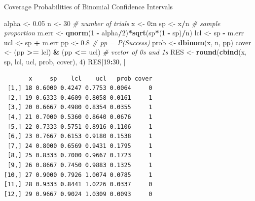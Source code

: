 \documentclass[
  ignorenonframetext,
]{beamer}
\newenvironment{Shaded}{\begin{snugshade}}{\end{snugshade}}
\newcommand{\CommentTok}[1]{\textcolor[rgb]{0.56,0.35,0.01}{\textit{#1}}}
\newcommand{\DecValTok}[1]{\textcolor[rgb]{0.00,0.00,0.81}{#1}}
\newcommand{\FloatTok}[1]{\textcolor[rgb]{0.00,0.00,0.81}{#1}}
\newcommand{\FunctionTok}[1]{\textcolor[rgb]{0.13,0.29,0.53}{\textbf{#1}}}
\newcommand{\NormalTok}[1]{#1}
\newcommand{\OtherTok}[1]{\textcolor[rgb]{0.56,0.35,0.01}{#1}}
\newcommand{\SpecialCharTok}[1]{\textcolor[rgb]{0.81,0.36,0.00}{\textbf{#1}}}
\begin{document}
\begin{frame}[fragile]{Coverage Probabilities of Binomial Confidence
Intervals}
\protect\hypertarget{coverage-probabilities-of-binomial-confidence-intervals-3}{}
\tiny

\begin{Shaded}
\begin{Highlighting}[]
\NormalTok{alpha }\OtherTok{\textless{}{-}} \FloatTok{0.05}
\NormalTok{n }\OtherTok{\textless{}{-}} \DecValTok{30}   \CommentTok{\# number of trials}
\NormalTok{x }\OtherTok{\textless{}{-}} \DecValTok{0}\SpecialCharTok{:}\NormalTok{n  }
\NormalTok{sp }\OtherTok{\textless{}{-}}\NormalTok{ x}\SpecialCharTok{/}\NormalTok{n }\CommentTok{\# sample proportion}
\NormalTok{m.err }\OtherTok{\textless{}{-}} \FunctionTok{qnorm}\NormalTok{(}\DecValTok{1} \SpecialCharTok{{-}}\NormalTok{ alpha}\SpecialCharTok{/}\DecValTok{2}\NormalTok{)}\SpecialCharTok{*}\FunctionTok{sqrt}\NormalTok{(sp}\SpecialCharTok{*}\NormalTok{(}\DecValTok{1} \SpecialCharTok{{-}}\NormalTok{ sp)}\SpecialCharTok{/}\NormalTok{n)}
\NormalTok{lcl }\OtherTok{\textless{}{-}}\NormalTok{ sp }\SpecialCharTok{{-}}\NormalTok{ m.err}
\NormalTok{ucl }\OtherTok{\textless{}{-}}\NormalTok{ sp }\SpecialCharTok{+}\NormalTok{ m.err}
\NormalTok{pp }\OtherTok{\textless{}{-}} \FloatTok{0.8}   \CommentTok{\# pp = P(Success)}
\NormalTok{prob }\OtherTok{\textless{}{-}} \FunctionTok{dbinom}\NormalTok{(x, n, pp)}
\NormalTok{cover }\OtherTok{\textless{}{-}}\NormalTok{ (pp }\SpecialCharTok{\textgreater{}=}\NormalTok{ lcl) }\SpecialCharTok{\&}\NormalTok{ (pp }\SpecialCharTok{\textless{}=}\NormalTok{ ucl)  }\CommentTok{\# vector of 0s and 1s}
\NormalTok{RES }\OtherTok{\textless{}{-}} \FunctionTok{round}\NormalTok{(}\FunctionTok{cbind}\NormalTok{(x, sp, lcl, ucl, prob, cover), }\DecValTok{4}\NormalTok{)}
\NormalTok{RES[}\DecValTok{19}\SpecialCharTok{:}\DecValTok{30}\NormalTok{, ]}
\end{Highlighting}
\end{Shaded}

\begin{verbatim}
       x     sp    lcl    ucl   prob cover
 [1,] 18 0.6000 0.4247 0.7753 0.0064     0
 [2,] 19 0.6333 0.4609 0.8058 0.0161     1
 [3,] 20 0.6667 0.4980 0.8354 0.0355     1
 [4,] 21 0.7000 0.5360 0.8640 0.0676     1
 [5,] 22 0.7333 0.5751 0.8916 0.1106     1
 [6,] 23 0.7667 0.6153 0.9180 0.1538     1
 [7,] 24 0.8000 0.6569 0.9431 0.1795     1
 [8,] 25 0.8333 0.7000 0.9667 0.1723     1
 [9,] 26 0.8667 0.7450 0.9883 0.1325     1
[10,] 27 0.9000 0.7926 1.0074 0.0785     1
[11,] 28 0.9333 0.8441 1.0226 0.0337     0
[12,] 29 0.9667 0.9024 1.0309 0.0093     0
\end{verbatim}


\end{frame}
\end{document}
